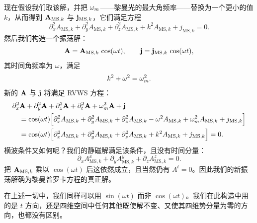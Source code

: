 现在假设我们取该解，并把 $\omega_m$——黎曼光的最大角频率——替换为一个更小的值 $k$，从而得到 $\mathbf{A}_{\text{MS},k}$ 与 $\mathbf{j}_{\text{MS},k}$，它们满足方程
\[
\partial_x^2 A_{\text{MS},k} + \partial_y^2 A_{\text{MS},k} + \partial_z^2 A_{\text{MS},k} + k^2 A_{\text{MS},k} + j_{\text{MS},k} = 0.
\]
然后我们构造一个振荡解：
\[
\mathbf{A} = \mathbf{A}_{\text{MS},k}\,\cos(\omega t), \qquad \mathbf{j} = \mathbf{j}_{\text{MS},k}\,\cos(\omega t),
\]
其时间角频率为 $\omega$，满足
\begin{equation}
k^2 + \omega^2 = \omega_m^2.
\end{equation}
新的 $\mathbf{A}$ 与 $\mathbf{j}$ 将满足 RVWS 方程：
\begin{equation}
\begin{aligned}
&\partial_x^2 \mathbf{A} + \partial_y^2 \mathbf{A} + \partial_z^2 \mathbf{A} + \partial_t^2 \mathbf{A} + \omega_m^2 \mathbf{A} + \mathbf{j}\\
&\quad = \cos(\omega t)\Big[\partial_x^2 A_{\text{MS},k} + \partial_y^2 A_{\text{MS},k} + \partial_z^2 A_{\text{MS},k} - \omega^2 A_{\text{MS},k} + \omega_m^2 A_{\text{MS},k} + j_{\text{MS},k}\Big]\\
&\quad = \cos(\omega t)\Big[\partial_x^2 A_{\text{MS},k} + \partial_y^2 A_{\text{MS},k} + \partial_z^2 A_{\text{MS},k} + k^2 A_{\text{MS},k} + j_{\text{MS},k}\Big] = 0.
\end{aligned}
\end{equation}
横波条件又如何呢？我们的静磁解满足该条件，且没有时间分量：
\[
\partial_x A_{\text{MS},k}^x + \partial_y A_{\text{MS},k}^y + \partial_z A_{\text{MS},k}^z = 0.
\]
把 $\mathbf{A}_{\text{MS},k}$ 乘以 $\cos(\omega t)$ 后这依然成立，且当然仍有 $A^t = 0$。因此我们的新振荡解确为黎曼普罗卡方程的真正解。

在上述一切中，我们同样可以用 $\sin(\omega t)$ 而非 $\cos(\omega t)$。我们在此构造中用的是 $t$ 方向，还是四维空间中任何其他既使解不变、又使其四维势分量为零的方向，也都没有区别。

